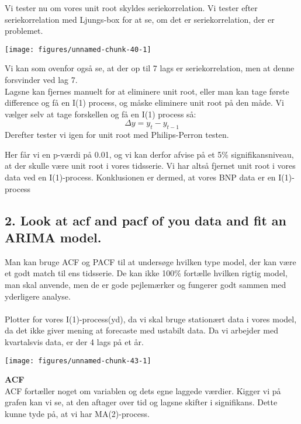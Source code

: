 \documentclass[
  10pt,
]{article}
\begin{document}
Vi tester nu om vores unit root skyldes seriekorrelation. Vi tester
efter seriekorrelation med Ljungs-box for at se, om det er
seriekorrelation, der er problemet.

\begin{center}\texttt{[image: figures/unnamed-chunk-40-1]} \end{center}

Vi kan som ovenfor også se, at der op til 7 lags er seriekorrelation,
men at denne forsvinder ved lag 7.\\
Lagsne kan fjernes manuelt for at eliminere unit root, eller man kan
tage første difference og få en I(1) process, og måske eliminere unit
root på den måde. Vi vælger selv at tage forskellen og få en I(1)
process så: \[\Delta y = y_t-y_{t-1} \] Derefter tester vi igen for unit
root med Philips-Perron testen.

Her får vi en p-værdi på 0.01, og vi kan derfor afvise på et 5\%
signifikansniveau, at der skulle være unit root i vores tidsserie. Vi
har altså fjernet unit root i vores data ved en I(1)-process.
Konklusionen er dermed, at vores BNP data er en I(1)-process

\newpage

\hypertarget{look-at-acf-and-pacf-of-you-data-and-fit-an-arima-model.}{%
\subsection{2. Look at acf and pacf of you data and fit an ARIMA
model.}\label{look-at-acf-and-pacf-of-you-data-and-fit-an-arima-model.}}

Man kan bruge ACF og PACF til at undersøge hvilken type model, der kan
være et godt match til ens tidsserie. De kan ikke 100\% fortælle hvilken
rigtig model, man skal anvende, men de er gode pejlemærker og fungerer
godt sammen med yderligere analyse.\\
~\\
Plotter for vores I(1)-process(yd), da vi skal bruge stationært data i
vores model, da det ikke giver mening at forecaste med ustabilt data. Da
vi arbejder med kvartalsvis data, er der 4 lags på et år.

\begin{center}\texttt{[image: figures/unnamed-chunk-43-1]} \end{center}

\textbf{ACF}\\
ACF fortæller noget om variablen og dets egne laggede værdier. Kigger vi
på grafen kan vi se, at den aftager over tid og lagsne skifter i
signifikans. Dette kunne tyde på, at vi har MA(2)-process.
\end{document}
